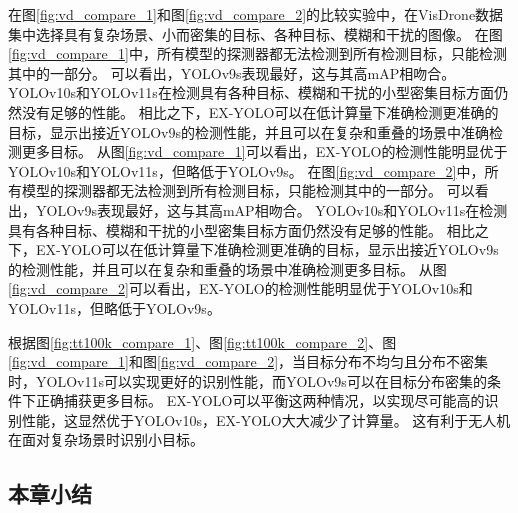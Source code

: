 在图\ref{fig:vd_compare_1}和图\ref{fig:vd_compare_2}的比较实验中，在VisDrone数据集中选择具有复杂场景、小而密集的目标、各种目标、模糊和干扰的图像。
在图\ref{fig:vd_compare_1}中，所有模型的探测器都无法检测到所有检测目标，只能检测其中的一部分。 可以看出，YOLOv9s表现最好，这与其高mAP相吻合。 YOLOv10s和YOLOv11s在检测具有各种目标、模糊和干扰的小型密集目标方面仍然没有足够的性能。 相比之下，EX-YOLO可以在低计算量下准确检测更准确的目标，显示出接近YOLOv9s的检测性能，并且可以在复杂和重叠的场景中准确检测更多目标。 从图\ref{fig:vd_compare_1}可以看出，EX-YOLO的检测性能明显优于YOLOv10s和YOLOv11s，但略低于YOLOv9s。
在图\ref{fig:vd_compare_2}中，所有模型的探测器都无法检测到所有检测目标，只能检测其中的一部分。 可以看出，YOLOv9s表现最好，这与其高mAP相吻合。 YOLOv10s和YOLOv11s在检测具有各种目标、模糊和干扰的小型密集目标方面仍然没有足够的性能。 相比之下，EX-YOLO可以在低计算量下准确检测更准确的目标，显示出接近YOLOv9s的检测性能，并且可以在复杂和重叠的场景中准确检测更多目标。 从图\ref{fig:vd_compare_2}可以看出，EX-YOLO的检测性能明显优于YOLOv10s和YOLOv11s，但略低于YOLOv9s。

根据图\ref{fig:tt100k_compare_1}、图\ref{fig:tt100k_compare_2}、图\ref{fig:vd_compare_1}和图\ref{fig:vd_compare_2}，当目标分布不均匀且分布不密集时，YOLOv11s可以实现更好的识别性能，而YOLOv9s可以在目标分布密集的条件下正确捕获更多目标。 EX-YOLO可以平衡这两种情况，以实现尽可能高的识别性能，这显然优于YOLOv10s，EX-YOLO大大减少了计算量。 这有利于无人机在面对复杂场景时识别小目标。

\subsection{本章小结}
